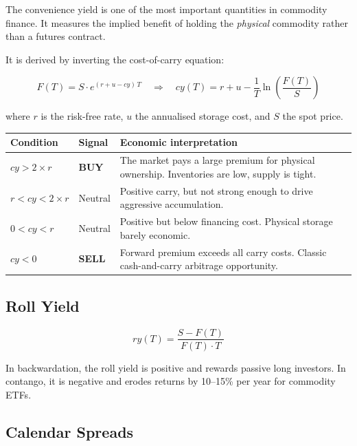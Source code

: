 \documentclass[11pt,a4paper]{article}
\begin{document}
The convenience yield is one of the most important quantities in commodity finance. It measures the implied benefit of holding the \textit{physical} commodity rather than a futures contract.

It is derived by inverting the cost-of-carry equation:

\begin{equation}
F(T) = S \cdot e^{(r + u - cy)\,T}
\quad \Longrightarrow \quad
cy(T) = r + u - \frac{1}{T}\ln\!\left(\frac{F(T)}{S}\right)
\end{equation}

where $r$ is the risk-free rate, $u$ the annualised storage cost, and $S$ the spot price.

\begin{center}
\begin{tabularx}{\textwidth}{l l X}
\toprule
Condition & Signal & Economic interpretation \\
\midrule
$cy > 2 \times r$ & \textcolor{signalgreen}{\textbf{BUY}} & The market pays a large premium for physical ownership. Inventories are low, supply is tight. \\
$r < cy < 2 \times r$ & Neutral & Positive carry, but not strong enough to drive aggressive accumulation. \\
$0 < cy < r$ & Neutral & Positive but below financing cost. Physical storage barely economic. \\
$cy < 0$ & \textcolor{signalred}{\textbf{SELL}} & Forward premium exceeds all carry costs. Classic cash-and-carry arbitrage opportunity. \\
\bottomrule
\end{tabularx}
\end{center}

\subsection{Roll Yield}

\begin{equation}
ry(T) = \frac{S - F(T)}{F(T) \cdot T}
\end{equation}

In backwardation, the roll yield is positive and rewards passive long investors.
In contango, it is negative and erodes returns by 10--15\% per year for commodity ETFs.

\subsection{Calendar Spreads}
\end{document}
